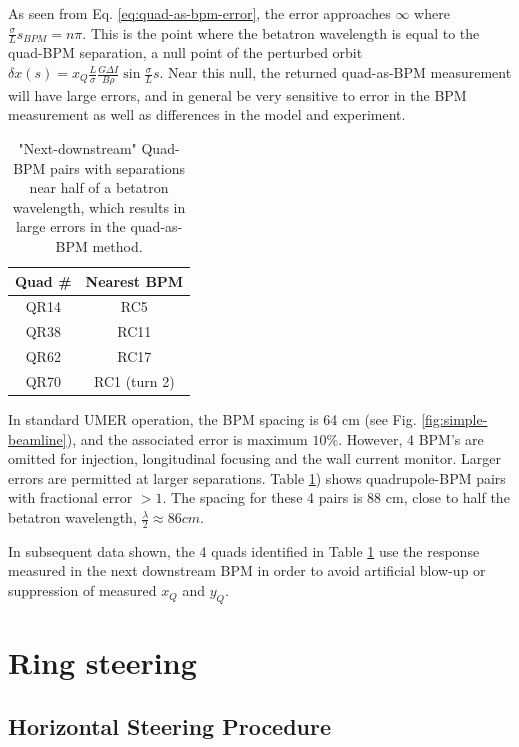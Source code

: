 As seen from Eq. \ref{eq:quad-as-bpm-error}, the error approaches $\infty$ where $\frac{\sigma}{L}s_{BPM} = n\pi$. This is the point where the betatron wavelength is equal to the quad-BPM separation, a null point of the perturbed orbit $\delta x(s) = x_Q \frac{L}{\sigma} \frac{G \Delta I}{B\rho} \sin{\frac{\sigma}{L}s}$. Near this null, the returned quad-as-BPM measurement will have large errors, and in general be very sensitive to error in the BPM measurement as well as differences in the model and experiment. 


\begin{table}
\centering
\caption{"Next-downstream" Quad-BPM pairs with separations near half of a betatron wavelength, which results in large errors in the quad-as-BPM method.}
\label{tab:nulls}
\begin{tabular}{|c|c|}
Quad \# & Nearest BPM  \\
\hline
QR14 & RC5  \\
QR38 & RC11  \\
QR62 & RC17  \\
QR70 & RC1 (turn 2)  \\
\end{tabular}
\end{table}


In standard UMER operation, the BPM spacing is 64 cm (see Fig. \ref{fig:simple-beamline}), and the associated error is maximum $10\%$. However, 4 BPM's are omitted for injection, longitudinal focusing and the wall current monitor. Larger errors are permitted at larger separations. 
Table \ref{tab:nulls}) shows quadrupole-BPM pairs with fractional error $>1$. The spacing for these 4 pairs is 88 cm, close to half the betatron wavelength, $\frac{\lambda}{2} \approx 86 cm$. 

In subsequent data shown, the 4 quads identified in Table \ref{tab:nulls} use the response measured in the next downstream BPM in order to avoid artificial blow-up or suppression of measured $x_Q$ and $y_Q$. 



\section{Ring steering} \label{sec:steering:ringsteering}




\subsection{Horizontal Steering Procedure}

